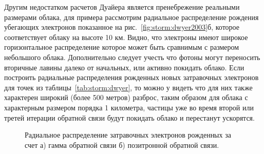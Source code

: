 Другим недостатком расчетов Дуайера является пренебрежение реальными размерами облака, для примера рассмотрим радиальное распределение рождения убегающих электронов показанное на рис.~\ref{fig:storm:dwyer2003}б, которое соответствует облаку на высоте 10 км. Видно, что электроны имеют широкое горизонтальное распределение которое может быть сравнимым с размером небольшого облака. Дополнительно следует учесть что фотоны могут переносить вторичные лавины далеко от начальных, или активно покидать облако. Если построить радиальные распределения рожденных новых затравочных электронов для точек из таблицы~\ref{tab:storm:dwyer}, то можно у видеть что для них также характерен широкий (более 500 метров) разброс, таким образом для облака с характерным размером порядка 1 километра, частицы уже во время второй или третей итерации обратной связи будут покидать облако и перестанут ускорятся. 
\begin{figure}[t]
    \begin{center}
        \begin{minipage}[h]{0.49\linewidth}
        \end{minipage}
        \hfill
        \begin{minipage}[h]{0.49\linewidth}
        \end{minipage}
        \caption{Радиальное распределение затравочных электронов рожденных за счет а) гамма обратной связи б) позитронной обратной связи.}
    \end{center}
    \label{fig:storm:radial_fb}
\end{figure}


